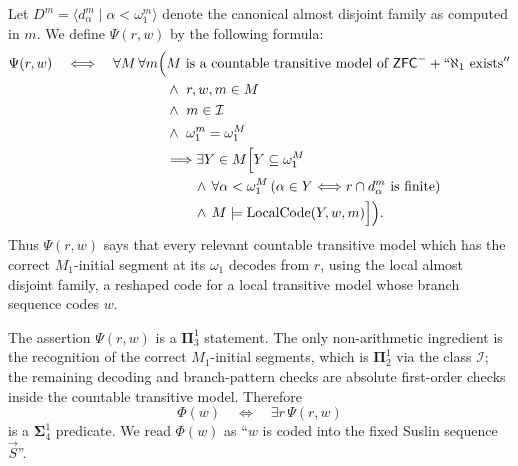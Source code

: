 \documentclass[a4paper,11pt]{article}
\newcommand{\ZFC}{\mathsf{ZFC}}
\begin{document}
Let $D^m=\langle d^m_\alpha\mid\alpha<\omega_1^m\rangle$ denote the canonical almost disjoint family as computed in $m$.  We define $\Psi(r,w)$ by the following formula:
\begin{align*}
\Psi(r,w)\quad\Longleftrightarrow\quad
\forall M\,\forall m\Big(&
   M \text{ is a countable transitive model of }
      \ZFC^-+``\aleph_1\text{ exists}'' \\
&\wedge\ r,w,m\in M \\
&\wedge\ m\in\mathcal I \\
&\wedge\ \omega_1^m=\omega_1^M \\
&\Longrightarrow
   \exists Y\in M\Big[
      Y\subseteq\omega_1^M \\
&\qquad\wedge\,
      \forall\alpha<\omega_1^M\,
      (\alpha\in Y\Longleftrightarrow r\cap d^m_\alpha
         \text{ is finite}) \\
&\qquad\wedge\,
      M\models\operatorname{LocalCode}(Y,w,m)
   \Big]\Big).
\end{align*}
Thus $\Psi(r,w)$ says that every relevant countable transitive model which has the correct $M_1$-initial segment at its $\omega_1$ decodes from $r$, using the local almost disjoint family, a reshaped code for a local transitive model whose branch sequence codes $w$.

The assertion $\Psi(r,w)$ is a $\boldsymbol\Pi^1_3$ statement.  The only non-arithmetic ingredient is the recognition of the correct $M_1$-initial segments, which is $\boldsymbol\Pi^1_2$ via the class $\mathcal I$; the remaining decoding and branch-pattern checks are absolute first-order checks inside the countable transitive model.  Therefore
\[
   \Phi(w)\quad\Longleftrightarrow\quad \exists r\,\Psi(r,w)
\]
is a $\boldsymbol\Sigma^1_4$ predicate.  We read $\Phi(w)$ as ``$w$ is coded into the fixed Suslin sequence $\vec S$''.
\end{document}
